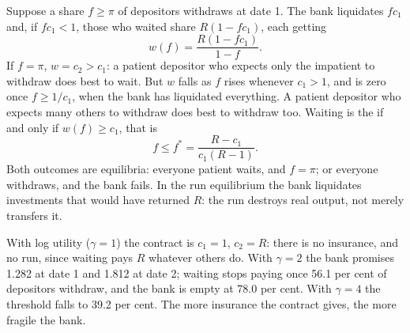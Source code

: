 Suppose a share $f \geq \pi$ of depositors withdraws at date 1. The bank liquidates $fc_1$ and, if $fc_1 < 1$, those who
waited share $R(1 - fc_1)$, each getting
\[
w(f) = \frac{R(1 - fc_1)}{1 - f}.
\]
If $f = \pi$, $w = c_2 > c_1$: a patient depositor who expects only the impatient to withdraw does best to wait. But $w$
falls as $f$ rises whenever $c_1 > 1$, and is zero once $f \geq 1/c_1$, when the bank has liquidated everything. A patient
depositor who expects many others to withdraw does best to withdraw too. Waiting is the  if and only if
$w(f) \geq c_1$, that is
\begin{equation}\label{eq:b2:banks-and-crises:threshold}
f \leq f^* = \frac{R - c_1}{c_1(R - 1)}.
\end{equation}
Both outcomes are equilibria: everyone patient waits, and $f = \pi$; or everyone withdraws, and the bank fails. In the run
equilibrium the bank liquidates investments that would have returned $R$: the run destroys real output, not merely
transfers it.

\label{lst:b2:banks-and-crises:dd}

\label{out:b2:banks-and-crises:dd}

With log utility ($\gamma = 1$) the contract is $c_1 = 1$, $c_2 = R$: there is no insurance, and no run, since waiting
pays $R$ whatever others do. With $\gamma = 2$ the bank promises 1.282 at date 1 and 1.812 at date 2; waiting stops paying
once 56.1 per cent of depositors withdraw, and the bank is empty at 78.0 per cent. With $\gamma = 4$ the threshold falls
to 39.2 per cent. The more insurance the contract gives, the more fragile the bank.

